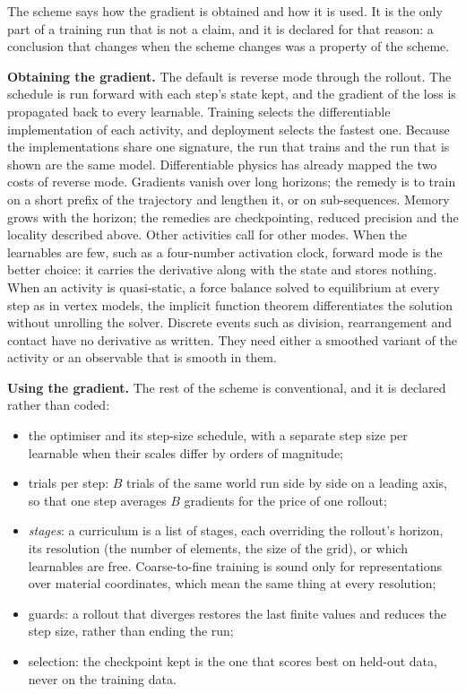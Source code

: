 \documentclass[11pt]{article}
\begin{document}
The scheme says how the gradient is obtained and how it is used. It is the only part of a
training run that is not a claim, and it is declared for that reason: a conclusion that
changes when the scheme changes was a property of the scheme.

\textbf{Obtaining the gradient.} The default is reverse mode through the rollout. The
schedule is run forward with each step's state kept, and the gradient of the loss is
propagated back to every learnable. Training selects the differentiable implementation
of each activity, and deployment selects the fastest one. Because the implementations
share one signature, the run that trains and the run that is shown are the same model.
Differentiable physics has already mapped the two costs of reverse mode. Gradients vanish
over long horizons; the remedy is to train on a short prefix of the trajectory and
lengthen it, or on sub-sequences. Memory grows with the horizon; the remedies are
checkpointing, reduced precision and the locality described above. Other activities call
for other modes. When the learnables are few, such as a four-number activation clock,
forward mode is the better choice: it carries the derivative along with the state and
stores nothing. When an activity is quasi-static, a force balance solved to equilibrium
at every step as in vertex models, the implicit function theorem differentiates the
solution without unrolling the solver. Discrete events such as division, rearrangement
and contact have no derivative as written. They need either a smoothed variant of the
activity or an observable that is smooth in them.

\textbf{Using the gradient.} The rest of the scheme is conventional, and it is declared
rather than coded:
\begin{itemize}
\item the optimiser and its step-size schedule, with a separate step size per learnable
when their scales differ by orders of magnitude;
\item trials per step: $B$ trials of the same world run side by side on a leading axis,
so that one step averages $B$ gradients for the price of one rollout;
\item \emph{stages}: a curriculum is a list of stages, each overriding the rollout's
horizon, its resolution (the number of elements, the size of the grid), or which
learnables are free. Coarse-to-fine training is sound only for representations over
material coordinates, which mean the same thing at every resolution;
\item guards: a rollout that diverges restores the last finite values and reduces the
step size, rather than ending the run;
\item selection: the checkpoint kept is the one that scores best on held-out data, never
on the training data.
\end{itemize}
\end{document}
